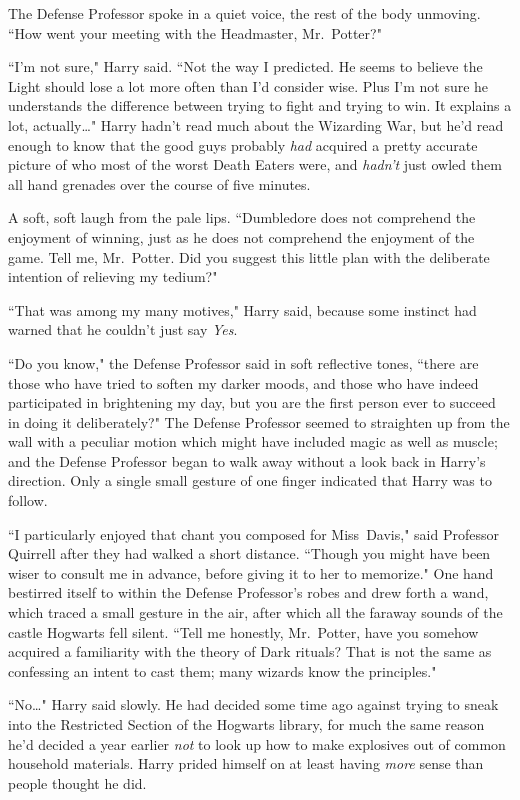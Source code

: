 The Defense Professor spoke in a quiet voice, the rest of the body unmoving. ``How went your meeting with the Headmaster, Mr.~Potter?"

``I'm not sure," Harry said. ``Not the way I predicted. He seems to believe the Light should lose a lot more often than I'd consider wise. Plus I'm not sure he understands the difference between trying to fight and trying to win. It explains a lot, actually{\ldots}" Harry hadn't read much about the Wizarding War, but he'd read enough to know that the good guys probably \emph{had} acquired a pretty accurate picture of who most of the worst Death Eaters were, and \emph{hadn't} just owled them all hand grenades over the course of five minutes.

A soft, soft laugh from the pale lips. ``Dumbledore does not comprehend the enjoyment of winning, just as he does not comprehend the enjoyment of the game. Tell me, Mr.~Potter. Did you suggest this little plan with the deliberate intention of relieving my tedium?"

``That was among my many motives," Harry said, because some instinct had warned that he couldn't just say \emph{Yes}.

``Do you know," the Defense Professor said in soft reflective tones, ``there are those who have tried to soften my darker moods, and those who have indeed participated in brightening my day, but you are the first person ever to succeed in doing it deliberately?" The Defense Professor seemed to straighten up from the wall with a peculiar motion which might have included magic as well as muscle; and the Defense Professor began to walk away without a look back in Harry's direction. Only a single small gesture of one finger indicated that Harry was to follow.

``I particularly enjoyed that chant you composed for Miss~Davis," said Professor Quirrell after they had walked a short distance. ``Though you might have been wiser to consult me in advance, before giving it to her to memorize." One hand bestirred itself to within the Defense Professor's robes and drew forth a wand, which traced a small gesture in the air, after which all the faraway sounds of the castle Hogwarts fell silent. ``Tell me honestly, Mr.~Potter, have you somehow acquired a familiarity with the theory of Dark rituals? That is not the same as confessing an intent to cast them; many wizards know the principles."

``No{\ldots}" Harry said slowly. He had decided some time ago against trying to sneak into the Restricted Section of the Hogwarts library, for much the same reason he'd decided a year earlier \emph{not} to look up how to make explosives out of common household materials. Harry prided himself on at least having \emph{more} sense than people thought he did.


